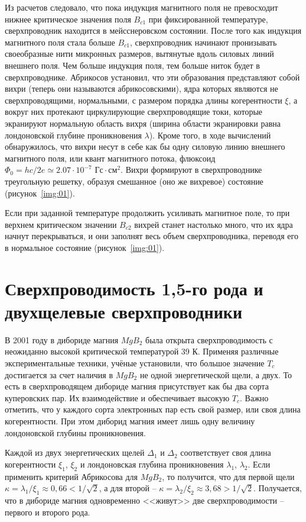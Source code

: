 Из расчетов следовало, что пока индукция магнитного поля не превосходит нижнее 
критическое значения поля \( B_{c1} \) при фиксированной температуре, 
сверхпроводник находится в мейсснеровском состоянии. После того как индукция 
магнитного поля стала больше \( B_{c1} \), сверхпроводник начинают пронизывать 
своеобразные нити микронных размеров, вытянутые вдоль силовых линий внешнего 
поля. Чем больше индукция поля, тем больше ниток будет в сверхпроводнике. 
Абрикосов установил, что эти образования представляют собой вихри (теперь они 
называются абрикосовскими), ядра которых являются не сверхпроводящими, 
нормальными, с размером порядка длины когерентности \( \xi \), а вокруг них 
протекают циркулирующие сверхпроводящие токи, которые экранируют нормальную 
область вихря (ширина области экранировки равна лондоновской глубине 
проникновения \( \lambda \)). Кроме того, в ходе вычислений обнаружилось, что 
вихри несут в себе как бы одну силовую линию внешнего магнитного поля, или 
квант магнитного потока, флюксоид 
\( \Phi_0 = hc/2e \simeq 2.07\cdot10^{-7} \text{ Гс}\cdot\text{см}^2 \). Вихри 
формируют в сверхпроводнике треугольную решетку, образуя смешанное (оно же 
вихревое) состояние (рисунок~\ref{img:01}).

Если при заданной температуре продолжить усиливать магнитное поле, то при 
верхнем критическом значении \( B_{c2} \) вихрей станет настолько много, что 
их ядра начнут перекрываться, и они заполнят весь объем сверхпроводника, 
переводя его в нормальное состояние (рисунок~\ref{img:01}). \cite{bib:net}

\section{Сверхпроводимость 1,5-го рода и двухщелевые сверхпроводники}
В 2001 году в дибориде магния \( MgB_2 \) была открыта сверхпроводимость с 
неожиданно высокой критической температурой 39 К. Применяя различные 
экспериментальные техники, учёные установили, что большое значение \( T_c \) 
достигается за счет наличия в \( MgB_2 \) не одной энергетической щели, а 
двух. То есть в сверхпроводящем дибориде магния присутствует как бы два сорта 
куперовских пар. Их взаимодействие и обеспечивает высокую \( T_c \). Важно 
отметить, что у каждого сорта электронных пар есть свой размер, или своя длина 
когерентности. При этом диборид магния имеет лишь одну величину лондоновской 
глубины проникновения. \cite{bib:net}

Каждой из двух энергетических щелей \( \Delta_1 \) и \( \Delta_2 \) 
соответствует своя длина когерентности \( \xi_1 \), \( \xi_2 \) и лондоновская 
глубина проникновения \( \lambda_1 \), \( \lambda_2 \). Если применить 
критерий Абрикосова для \( MgB_2 \), то получится, что для первой щели 
\( \kappa = \lambda_1 / \xi_1 \approx 0,66 < 1/\sqrt{2} \), а для второй -- 
\( \kappa = \lambda_2 / \xi_2 \approx 3,68 > 1/\sqrt{2} \). Получается, что в 
дибориде магния одновременно <<живут>> две сверхпроводимости -- первого и 
второго рода.

